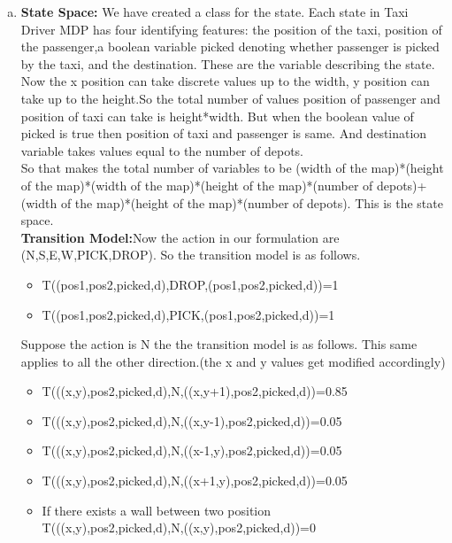 \documentclass{article}
\begin{document}
\begin{enumerate}[a)]
    \item
\textbf{State Space:}
We have created a class for the state. Each state in Taxi Driver MDP has four identifying features: the position of the taxi, position of the passenger,a boolean variable picked denoting whether passenger is picked by the taxi, and the destination. These are the variable describing the state.\\
Now the x position can take discrete values up to the width, y position can take up to the height.So the total number of values position of passenger and position of taxi can take is height*width. But when the boolean value of picked is true then position of taxi and passenger is same. And destination variable takes values equal to the number of depots. \\
So that makes the total number of variables to be (width of the map)*(height of the map)*(width of the map)*(height of the map)*(number of depots)+(width of the map)*(height of the map)*(number of depots). This is the state space.\\
\newline
\textbf{Transition Model:}Now the action in our formulation are (N,S,E,W,PICK,DROP). So the transition model is as follows.
\begin{itemize}
    \item T((pos1,pos2,picked,d),DROP,(pos1,pos2,picked,d))=1
    \item T((pos1,pos2,picked,d),PICK,(pos1,pos2,picked,d))=1
\end{itemize}
Suppose the action is N the the transition model is as follows. This same applies to all the other direction.(the x and y values get modified accordingly)
\begin{itemize}
    \item T(((x,y),pos2,picked,d),N,((x,y+1),pos2,picked,d))=0.85
    \item T(((x,y),pos2,picked,d),N,((x,y-1),pos2,picked,d))=0.05
    \item T(((x,y),pos2,picked,d),N,((x-1,y),pos2,picked,d))=0.05
    \item T(((x,y),pos2,picked,d),N,((x+1,y),pos2,picked,d))=0.05
    \item If there exists a wall between two position\\
        T(((x,y),pos2,picked,d),N,((x,y),pos2,picked,d))=0\\
\end{itemize}



\end{enumerate}
\end{document}
